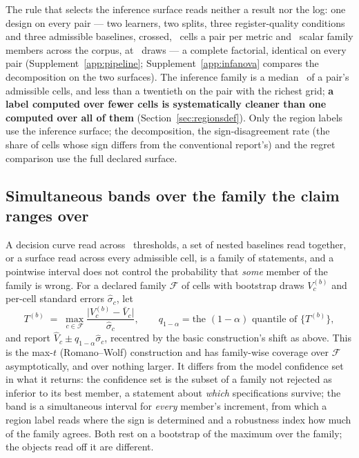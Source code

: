 \documentclass[11pt,3p,review,authoryear]{elsarticle}
\theoremstyle{definition}
\begin{document}
The rule that selects the inference surface reads neither a result nor the
log: one design on every pair --- two learners, two splits, three
register-quality conditions and three admissible baselines, crossed,
\nCellsPerDecomposition\ cells a pair per metric and \nInferenceScalar\
scalar family members across the corpus, at \nDrawsSurface\ draws --- a
complete factorial, identical on every pair (Supplement~\ref{app:pipeline};
Supplement~\ref{app:infanova} compares the decomposition on the two
surfaces). The inference family is a median
\inferenceShareAdmissibleMedianPct\ of a pair's admissible cells, and less
than a twentieth on the pair with the richest grid; \textbf{a label
computed over fewer cells is systematically cleaner than one computed over
all of them} (Section~\ref{sec:regionsdef}). Only the region labels use the
inference surface; the decomposition, the sign-disagreement rate (the share
of cells whose sign differs from the conventional report's) and the regret
comparison use the full declared surface.

\subsection{Simultaneous bands over the family the claim ranges over}
\label{sec:simbands}

A decision curve read across \nGrid\ thresholds, a set of nested baselines
read together, or a surface read across every admissible cell, is a family of
statements, and a pointwise interval does not control the probability that
\emph{some} member of the family is wrong. For a declared family
$\mathcal{F}$ of cells with bootstrap draws $V^{(b)}_c$ and per-cell standard
errors $\hat\sigma_c$, let
\[
T^{(b)} \;=\; \max_{c \in \mathcal{F}}
\frac{\bigl|V^{(b)}_c - \bar{V}_c\bigr|}{\hat\sigma_c},
\qquad
q_{1-\alpha} = \text{the } (1-\alpha)\text{ quantile of } \{T^{(b)}\},
\]
and report $\hat{V}_c \pm q_{1-\alpha}\hat\sigma_c$, recentred by the basic
construction's shift as above. This is the max-$t$
(Romano--Wolf) construction \citep{romano2005stepdown} and has family-wise
coverage over $\mathcal{F}$ asymptotically, and over nothing larger. It
differs from the model confidence set \citep{hansen2011mcs} in what it
returns: the confidence set is the subset of a family not rejected as
inferior to its best member, a statement about \emph{which} specifications
survive; the band is a simultaneous interval for \emph{every} member's
increment, from which a region label reads where the sign is determined and
a robustness index how much of the family agrees. Both rest on a bootstrap
of the maximum over the family; the objects read off it are different.
\end{document}
